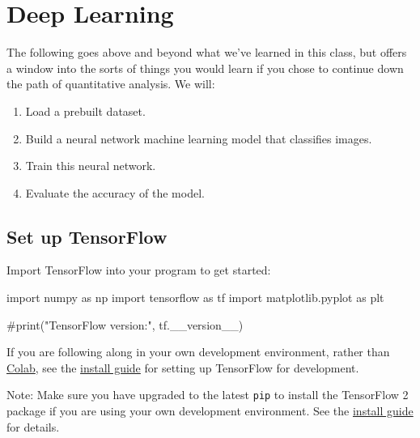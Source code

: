 \documentclass[
  letterpaper,
  DIV=11,
  numbers=noendperiod]{scrreprt}
\newenvironment{Shaded}{\begin{snugshade}}{\end{snugshade}}
\newcommand{\CommentTok}[1]{\textcolor[rgb]{0.37,0.37,0.37}{#1}}
\newcommand{\ImportTok}[1]{\textcolor[rgb]{0.00,0.46,0.62}{#1}}
\newcommand{\NormalTok}[1]{\textcolor[rgb]{0.00,0.23,0.31}{#1}}
\providecommand{\tightlist}{%
  \setlength{\itemsep}{0pt}\setlength{\parskip}{0pt}}\usepackage{longtable,booktabs,array}
\begin{document}

\hypertarget{deep-learning}{%
\chapter{Deep Learning}\label{deep-learning}}

The following goes above and beyond what we've learned in this class,
but offers a window into the sorts of things you would learn if you
chose to continue down the path of quantitative analysis. We will:

\begin{enumerate}
\def\labelenumi{\arabic{enumi}.}
\tightlist
\item
  Load a prebuilt dataset.
\item
  Build a neural network machine learning model that classifies images.
\item
  Train this neural network.
\item
  Evaluate the accuracy of the model.
\end{enumerate}

\hypertarget{set-up-tensorflow}{%
\section{Set up TensorFlow}\label{set-up-tensorflow}}

Import TensorFlow into your program to get started:

\begin{Shaded}
\begin{Highlighting}[]
\ImportTok{import}\NormalTok{ numpy }\ImportTok{as}\NormalTok{ np}
\ImportTok{import}\NormalTok{ tensorflow }\ImportTok{as}\NormalTok{ tf}
\ImportTok{import}\NormalTok{ matplotlib.pyplot }\ImportTok{as}\NormalTok{ plt}

\CommentTok{\#print("TensorFlow version:", tf.\_\_version\_\_)}
\end{Highlighting}
\end{Shaded}

If you are following along in your own development environment, rather
than
\href{https://colab.research.google.com/github/tensorflow/docs/blob/master/site/en/tutorials/quickstart/beginner.ipynb}{Colab},
see the \href{https://www.tensorflow.org/install}{install guide} for
setting up TensorFlow for development.

Note: Make sure you have upgraded to the latest \texttt{pip} to install
the TensorFlow 2 package if you are using your own development
environment. See the \href{https://www.tensorflow.org/install}{install
guide} for details.
\end{document}
